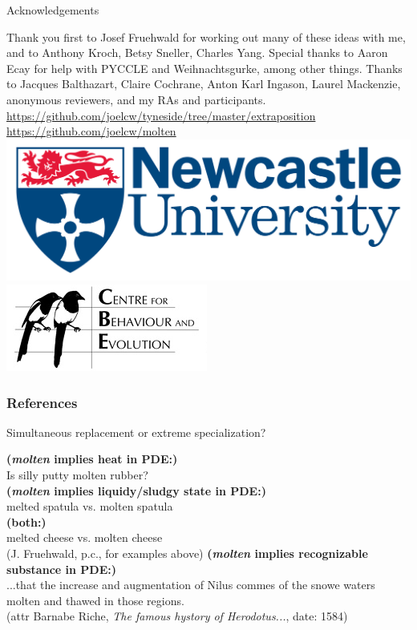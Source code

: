 \documentclass[hyperref={pdfpagelabels=false}]{beamer}
\begin{document}
\begin{frame}{Acknowledgements}
\begin{center}
Thank you first to Josef Fruehwald for working out many of these ideas with me, and to Anthony Kroch, Betsy Sneller, Charles Yang. Special thanks to Aaron Ecay for help with PYCCLE and Weihnachtsgurke, among other things. Thanks to Jacques Balthazart, Claire Cochrane, Anton Karl Ingason, Laurel Mackenzie, anonymous reviewers, and my RAs and participants.
\vspace{5mm}\\
\url{https://github.com/joelcw/tyneside/tree/master/extraposition}\\\url{https://github.com/joelcw/molten}\\\vspace{3mm}
\includegraphics[scale = 0.1]{ncllogo.jpg} \includegraphics[scale = 0.4]{cbelogo.jpg} 
\end{center}
\end{frame}


\begin{frame}[allowframebreaks]
\frametitle{References}
\newcommand*{\newblock}{natbib}


\end{frame}


\begin{frame}{Simultaneous replacement or extreme specialization?}
		\begin{exe}
			\ex \textbf{(\textsl{molten} implies heat in PDE:)}\\
			Is silly putty molten rubber?\\
			\ex \textbf{(\textsl{molten} implies liquidy/sludgy state in PDE:)}\\
			melted spatula vs. molten spatula\\
			\ex \textbf{(both:)}\\
			melted cheese vs. molten cheese\\
			(J. Fruehwald, p.c., for examples above)
			\ex \textbf{(\textsl{molten} implies recognizable substance in PDE:)}\\
			...that the increase and augmentation of Nilus commes of the snowe waters molten and thawed in those regions.\\
			(attr Barnabe Riche, \textsl{The famous hystory of Herodotus...}, date: 1584)
		\end{exe}
		
\end{frame}
\end{document}
